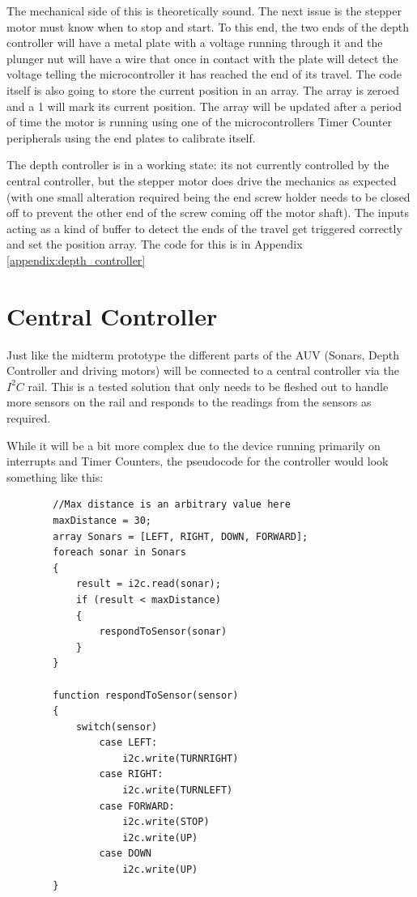 \documentclass[11pt,a4paper,titlepage]{report}
\begin{document}
	The mechanical side of this is theoretically sound. The next issue is the stepper motor must know when to stop and start. To this end, the two ends of the depth controller will have a metal plate with a voltage running through it and the plunger nut will have a wire that once in contact with the plate will detect the voltage telling the microcontroller it has reached the end of its travel. The code itself is also going to store the current position in an array. The array is zeroed and a 1 will mark its current position. The array will be updated after a period of time the motor is running using one of the microcontrollers Timer Counter peripherals using the end plates to calibrate itself. 
	
	The depth controller is in a working state: its not currently controlled by the central controller, but the stepper motor does drive the mechanics as expected (with one small alteration required being the end screw holder needs to be closed off to prevent the other end of the screw coming off the motor shaft). The inputs acting as a kind of buffer to detect the ends of the travel get triggered correctly and set the position array. The code for this is in Appendix \ref{appendix:depth_controller}
	
	\section*{Central Controller}
	
	Just like the midterm prototype the different parts of the AUV (Sonars, Depth Controller and driving motors) will be connected to a central controller via the $I^{2}C$ rail. This is a tested solution that only needs to be fleshed out to handle more sensors on the rail and responds to the readings from the sensors as required. 
	
	While it will be a bit more complex due to the device running primarily on interrupts and Timer Counters, the pseudocode for the controller would look something like this:
	
	\begin{lstlisting}
		//Max distance is an arbitrary value here
		maxDistance = 30;
		array Sonars = [LEFT, RIGHT, DOWN, FORWARD];
		foreach sonar in Sonars
		{
			result = i2c.read(sonar);
			if (result < maxDistance)
			{
				respondToSensor(sonar)
			}	
		}
		
		function respondToSensor(sensor)
		{
			switch(sensor)
				case LEFT:
					i2c.write(TURNRIGHT)
				case RIGHT:
					i2c.write(TURNLEFT)
				case FORWARD:
					i2c.write(STOP)
					i2c.write(UP)
				case DOWN
					i2c.write(UP)
		}
	\end{lstlisting}
	
\end{document}
